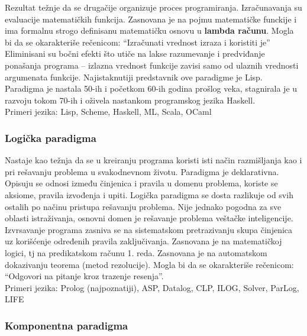 \documentclass[../main.tex]{subfiles}
\begin{document}
Rezultat težnje da se drugačije organizuje proces programiranja. Izračunavanja su evaluacije matematičkih funkcija. Zasnovana je na pojmu matematičke funckije i ima formalnu strogo definisanu matematičku osnovu u {\bf lambda računu}. Mogla bi da se okarakteriše rečenicom: ``Izračunati vrednost izraza i koristiti je''\\
Eliminisani su bočni efekti što utiče na lakse razumevanje i predviđanje ponašanja programa -- izlazna vrednost funkcije zavisi samo od ulaznih vrednosti argumenata funkcije. Najistaknutiji predstavnik ove paradigme je Lisp. Paradigma je nastala 50-ih i početkom 60-ih godina prošlog veka, stagnirala je u razvoju tokom 70-ih i oživela nastankom programskog jezika Haskell.\\
Primeri jezika: Lisp, Scheme, Haskell, ML, Scala, OCaml

\subsubsection{Logička paradigma}												

Nastaje kao težnja da se u kreiranju programa koristi isti način razmišljanja kao i pri rešavanju problema u svakodnevnom životu. Paradigma je deklarativna. Opisuju se odnosi između činjenica i pravila u domenu problema, koriste se aksiome, pravila izvođenja i upiti. Logička paradigma se dosta razlikuje od svih ostalih po načinu pristupa rešavanju problema. Nije jednako pogodna za sve oblasti istraživanja, osnovni domen je rešavanje problema veštačke inteligencije. Izvrsavanje programa zasniva se na sistematskom pretrazivanju skupa činjenica uz korišćenje određenih pravila zaključivanja. Zasnovana je na matematičkoj logici, tj na predikatskom računu 1. reda. Zasnovana je na automatskom dokazivanju teorema (metod rezolucije). Mogla bi da se okarakteriše rečenicom: ``Odgovori na pitanje kroz trazenje resenja''.\\
Primeri jezika: Prolog (najpoznatiji), ASP, Datalog, CLP, ILOG, Solver, ParLog, LIFE

\subsubsection{Komponentna paradigma}											
\end{document}
